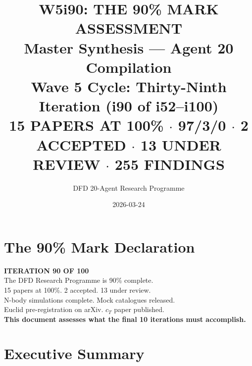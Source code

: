 \documentclass[11pt,a4paper]{article}
\title{\Huge W5i90: THE 90\% MARK ASSESSMENT\\[12pt]
\Large Master Synthesis --- Agent 20 Compilation\\[6pt]
\large Wave 5 Cycle: Thirty-Ninth Iteration (i90 of i52--i100)\\[6pt]
\normalsize \textbf{15 PAPERS AT 100\%} $\cdot$ 97/3/0 $\cdot$ 2 ACCEPTED $\cdot$ 13 UNDER REVIEW $\cdot$ 255 FINDINGS}
\author{DFD 20-Agent Research Programme}
\date{2026-03-24}
\begin{document}
\maketitle

\section*{The 90\% Mark Declaration}

\begin{tcolorbox}[colback=green!5!white, colframe=dfdgreen]
\begin{center}
\Large\textbf{ITERATION 90 OF 100}\\[6pt]
\large The DFD Research Programme is 90\% complete.\\[6pt]
\normalsize 15 papers at 100\%. 2 accepted. 13 under review.\\
N-body simulations complete. Mock catalogues released.\\
Euclid pre-registration on arXiv. $c_T$ paper published.\\[6pt]
\textbf{This document assesses what the final 10 iterations must accomplish.}
\end{center}
\end{tcolorbox}

\section{Executive Summary}
\end{document}
